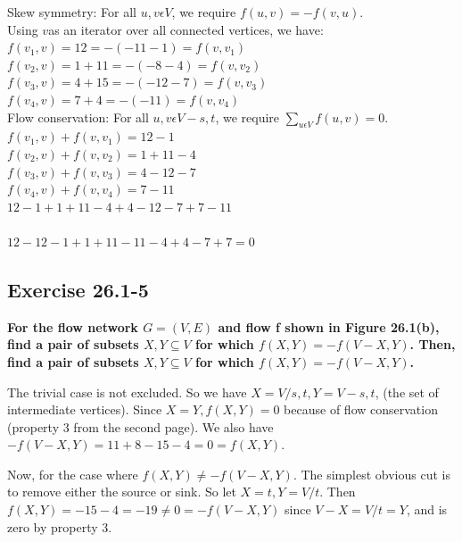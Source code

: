 \documentclass[10pt,fullpage]{article}
\begin{document}
Skew symmetry: For all $u,v\epsilon V$, we require $f(u, v) = - f
(v,u)$.\\
Using $v$\noindent as an iterator over all connected vertices, we
have:
\\

\noindent
$f(v_1,v) = 12 = -(-11-1) = f(v,v_1)$\\
$f(v_2,v) = 1 + 11 = -(-8-4) = f(v,v_2)$\\
$f(v_3,v) = 4 + 15 = -(-12-7) = f(v,v_3)$\\
$f(v_4,v) = 7 + 4 = -(-11) = f(v,v_4)$\\

Flow conservation: For all $u, v \epsilon V - {s, t}$, we require
$\sum_{u \epsilon V}f(u,v) = 0$.\\

\noindent
$f(v_1,v) + f(v,v_1) = 12 - 1$\\
$f(v_2,v) + f(v,v_2) = 1 + 11 - 4$\\
$f(v_3,v) + f(v,v_3) = 4 - 12 - 7$\\
$f(v_4,v) + f(v,v_4) = 7 - 11$\\

\noindent
$12-1+1+11-4+4-12-7+7-11$\\\\
$12-12-1+1+11-11-4+4-7+7 = 0$\\

\subsection*{Exercise 26.1-5}

\textbf{For the flow network $G = (V, E)$ and flow f shown in Figure
26.1(b), find a pair of subsets $X, Y \subseteq V$ for which $f(X,
Y) = - f(V - X, Y)$. Then, find a pair of subsets $X, Y \subseteq V$
for which $f (X, Y) = - f(V - X, Y)$.}

The trivial case is not excluded. So we have $X = V/{s,t}, Y = V -
{s,t}$, (the set of intermediate vertices). Since $X = Y, f(X,Y) =
0$ because of flow conservation (property 3 from the second page).
We also have $- f(V - X, Y) = 11 + 8 - 15 - 4 = 0 = f(X,Y)$.

Now, for the case where $f(X,Y) \neq - f(V - X, Y)$. The simplest
obvious cut is to remove either the source or sink. So let $X = {t},
Y = V / {t}$. Then $f(X,Y) = -15 - 4 = - 19 \neq 0 = -f(V-X, Y)$
since $V-X = V/{t} = Y$, and is zero by property 3.
\end{document}
